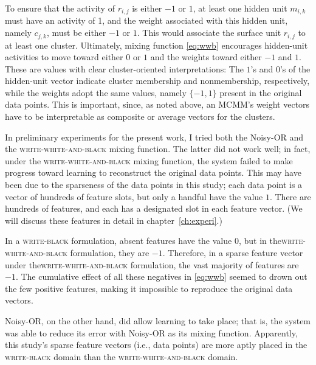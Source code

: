 To ensure that the activity of $r_{i,j}$ is either $-1$ or $1$, at least one hidden 
unit $m_{i,k}$ must have an activity of 1, and the weight associated with this 
hidden unit, namely $c_{j,k}$, must be either $-1$ or $1$. This would associate 
the surface unit $r_{i,j}$ to at least one cluster. Ultimately, mixing 
function \eqref{eq:wwb} encourages hidden-unit activities to move toward 
either $0$ or $1$ and the weights toward either $-1$ and $1$. These are 
values with clear cluster-oriented interpretations: The $1$'s and $0$'s of the 
hidden-unit vector indicate cluster membership and nonmembership, respectively, 
while the weights adopt the same values, namely $\{-1, 1\}$ present in the original data points. 
This is important, since, as noted above, an MCMM's weight vectors have to be 
interpretable as composite or average vectors for the clusters.

In preliminary experiments for the present work, I tried both the Noisy-OR 
and the \textsc{write-white-and-black} mixing function. The latter did 
not work well; in fact, under the \textsc{write-white-and-black} mixing function, the system 
failed to make progress toward learning to reconstruct the original 
data points. This may have been due to the sparseness of the data points 
in this study; each data point is a vector of hundreds of feature slots, but 
only a handful have the value $1$.
There are hundreds of features, and each has a designated slot in each feature vector.
(We will discuss these features in detail in chapter~\ref{ch:experi}.)

In a \textsc{write-black} formulation, absent features have the value $0$, but in the\textsc{write-white-and-black} formulation, they are $-1$. Therefore, in a sparse feature vector under the\textsc{write-white-and-black} formulation, the vast majority of features are $-1$. The cumulative effect of all these negatives in \eqref{eq:wwb} seemed to drown out the few positive features, making it impossible to reproduce the original data vectors. 

Noisy-OR, on the other hand, did allow learning to take place; that is, 
the system was able to reduce its error with Noisy-OR as its mixing function. 
Apparently, this study's sparse feature vectors (i.e., data points) are more aptly 
placed in the \textsc{write-black} domain than the \textsc{write-white-and-black} domain.

